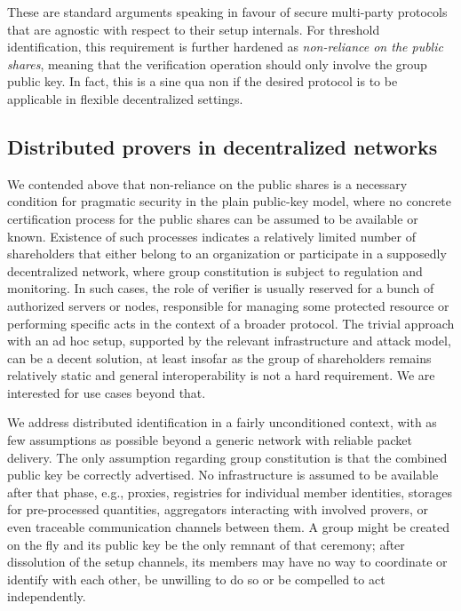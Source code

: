 \documentclass{iacrtrans}
\begin{document}
These are standard arguments speaking in favour
of secure multi-party protocols that are agnostic
with respect to their setup internals.
For threshold identification,
this requirement is further hardened as
\textit{non-reliance on the public shares},
meaning that the verification operation should only involve
the group public key.
In fact, this is a sine qua non if the desired protocol is
to be applicable in flexible decentralized settings.


\subsection{Distributed provers in decentralized networks}\label{section_distributed_provers}

We contended above that non-reliance on the public shares
is a necessary condition for pragmatic security
in the plain public-key model, where
no concrete certification process
for the public shares can be assumed
to be available or known.
Existence of such processes indicates
a relatively limited number of shareholders
that either belong to an organization or participate
in a supposedly decentralized network,
where group constitution is subject to
regulation and monitoring.
In such cases,
the role of verifier is usually reserved for
a bunch of authorized servers or nodes,
responsible for managing some protected resource or
performing specific acts in the context of a broader protocol.
The trivial approach with an ad hoc setup,
supported by the relevant infrastructure
and attack model,
can be a decent solution,
at least insofar as the group of shareholders
remains relatively static
and general interoperability
is not a hard requirement.
We are interested for use cases beyond that.

We address distributed identification in
a fairly unconditioned context,
with as few assumptions as possible
beyond a generic network
with reliable packet delivery.
The only assumption regarding
group constitution is that
the combined public key
be correctly advertised.
No infrastructure is
assumed to be available after that phase,
e.g., proxies, registries for individual member identities,
storages for pre-processed quantities,
aggregators interacting with involved provers,
or even traceable communication channels between them.
A group might be created on the fly and its public key
be the only remnant of that ceremony;
after dissolution of the setup channels,
its members may have no way to coordinate or identify
with each other, be unwilling to do so or be compelled to
act independently.
\end{document}
